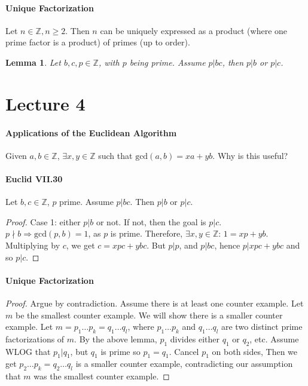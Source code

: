 \documentclass[10pt,letter]{article}
\theoremstyle{plain}
\newtheorem*{lemma*}{Lemma}
\theoremstyle{definition}
\begin{document}
\paragraph{Unique Factorization}
Let $n\in\mathbb{Z},n\geq2$. Then $n$ can be uniquely expressed as a product (where one prime factor is a product) of primes (up to order). 
\begin{lemma*}
Let $b,c,p\in\mathbb{Z}$, with $p$ being prime. Assume $p|bc$, then $p|b$ or $p|c$. 
\end{lemma*}

\section*{Lecture 4}
\paragraph{Applications of the Euclidean Algorithm}
Given $a,b\in\mathbb{Z}$, $\exists x,y\in\mathbb{Z}$ such that $\text{gcd}(a,b)=xa+yb$. Why is this useful? 
\paragraph{Euclid VII.30}
Let $b,c\in\mathbb{Z}$, $p$ prime. Assume $p|bc$. Then $p|b$ or $p|c$. 
\begin{proof}
     Case 1: either $p|b$ or not. If not, then the goal is $p|c$. $p\nmid b\Rightarrow \text{gcd}(p,b)=1$, as $p$ is prime. Therefore, $\exists x,y\in\mathbb{Z}$: $1=xp+yb$. Multiplying by $c$, we get $c=xpc+ybc$. But $p|p$, and $p|bc$, hence $p|xpc+ybc$ and so $p|c$. 
\end{proof}

\paragraph{Unique Factorization}
\begin{proof}
     Argue by contradiction. Assume there is at least one counter example. Let $m$ be the smallest counter example. We will show there is a smaller counter example. Let $m=p_1\ldots p_k=q_1\ldots q_l$, where $p_1\ldots p_k$ and $q_1\ldots q_l$ are two distinct prime factorizations of $m$. By the above lemma, $p_1$ divides either $q_1$ or $q_2$, etc. Assume WLOG that $p_1|q_1$, but $q_1$ is prime so $p_1=q_1$. Cancel $p_1$ on both sides, Then we get $p_2\ldots p_k=q_2\ldots q_l$ is a smaller counter example, contradicting our assumption that $m$ was the smallest counter example. 
\end{proof}
\end{document}
